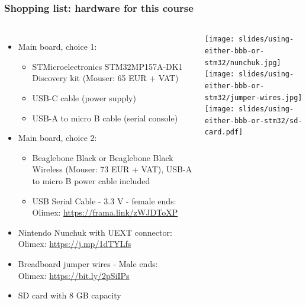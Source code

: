 \begin{frame}
\frametitle{Shopping list: hardware for this course}
  \begin{columns}
    \footnotesize
    \begin{itemize}
      \item Main board, choice 1:
      \begin{itemize}
        \item STMicroelectronics STM32MP157A-DK1 Discovery kit
        (Mouser: 65 EUR + VAT)
        \item USB-C cable (power supply)
        \item USB-A to micro B cable (serial console)
      \end{itemize}
      \item Main board, choice 2:
      \begin{itemize}
        \item Beaglebone Black or Beaglebone Black Wireless
        (Mouser: 73 EUR + VAT), USB-A to micro B power cable included
        \item USB Serial Cable - 3.3 V - female ends: \\
        Olimex: \url{https://frama.link/zWJDToXP}
      \end{itemize}
      \item Nintendo Nunchuk with UEXT connector: \\
            Olimex: \url{https://j.mp/1dTYLfs}
      \item Breadboard jumper wires - Male ends: \\
            Olimex: \url{https://bit.ly/2pSiIPs}
      \item SD card with 8 GB capacity
    \end{itemize}
    \texttt{[image: slides/using-either-bbb-or-stm32/nunchuk.jpg]} \\
    \vspace{1cm}
    \texttt{[image: slides/using-either-bbb-or-stm32/jumper-wires.jpg]} \\
    \vspace{1cm}
    \texttt{[image: slides/using-either-bbb-or-stm32/sd-card.pdf]}
  \end{columns}
\end{frame}
